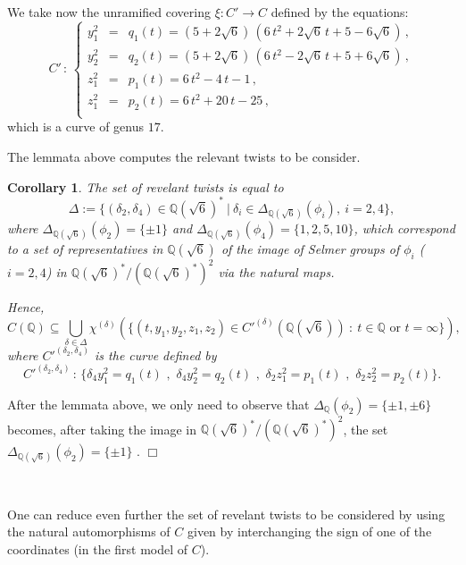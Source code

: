 \documentclass[a4paper,12pt]{amsart}
\newtheorem{cor}[thm]{Corollary}
\theoremstyle{remark}
\theoremstyle{definition}
\newenvironment{pf}{\par\noindent{\bf Proof.}\enspace\ignorespaces}{{\hfill $\Box$}\par\par}
\begin{document}
\

We take now the unramified covering $\xi: C'\to C$ defined by the
equations:
$$
C'\,:\,
\left\{
\begin{array}{rcl}
y_1^2&\!\!\!= &\!\!\! q_1(t)=  (5+2\sqrt{6})\,(6\,t^2+2\sqrt{6}\,t+5-6\sqrt{6})\,,\\[1mm]
y_2^2&\!\!\!= &\!\!\! q_2(t)= (5+2\sqrt{6})\,(6\,t^2-2\sqrt{6}\,t+5+6\sqrt{6})\,, \\[1mm]
z_1^2&\!\!\!= &\!\!\! p_1(t)= 6\,t^2-4\,t-1\,, \\[1mm]
z_1^2&\!\!\!= &\!\!\! p_2(t)=  6\,t^2+20\,t-25\,,\\[1mm]
\end{array}\right.
$$
which is a curve of genus $17$.

The lemmata above computes the relevant twists to be consider.

\begin{cor}\label{deltaC} The set of revelant twists is equal to
$$\Delta:=\{ (\delta_2,\delta_4)\in {{\mathbb{Q}}}(\sqrt{6})^* \ | \ \delta_i\in
\Delta_{{{\mathbb{Q}}}(\sqrt{6})}(\phi_i),\  i=2, 4\},$$ where $\Delta_{{{\mathbb{Q}}}(\sqrt{6})}(\phi_2)=\{ \pm 1\}$ and
$\Delta_{{{\mathbb{Q}}}(\sqrt{6})}(\phi_4)=\{1,2,5,10\}$, which correspond to a set of
representatives in ${{{\mathbb{Q}}}(\sqrt{6})}$ of the image of Selmer groups of $\phi_i$ ($i=2,4$)
in ${{{\mathbb{Q}}}(\sqrt{6})}^*/({{{\mathbb{Q}}}(\sqrt{6})}^*)^2$ via the natural maps.

Hence, $$C({{\mathbb{Q}}}) \subseteq \bigcup_{\delta \in \Delta}
\chi^{(\delta)}(\{(t,y_1,y_2,z_1,z_2)\in C'^{(\delta)}({{\mathbb{Q}}}(\sqrt{6}))\ : \ t\in {{\mathbb{Q}}}
 \mbox{ or } t=\infty \}),$$ where $C'^{(\delta_2,\delta_4)}$ is the curve defined by
$$C'^{(\delta_2,\delta_4)}\,:\,\{\delta_4 y_1^2=q_1(t) \,\,,\,\,
\delta_4 y_2^2=q_2(t) \,\,,\,\, \delta_2 z_1^2=p_1(t) \,\,,\,\, \delta_2 z_2^2=p_2(t)\}. $$
\end{cor}

\begin{pf} After the lemmata above, we only need to observe that
$\Delta_{{\mathbb{Q}}}(\phi_2)=\{ \pm 1,\pm 6\}$ becomes, after taking the
image in ${{{\mathbb{Q}}}(\sqrt{6})}^*/({{{\mathbb{Q}}}(\sqrt{6})}^*)^2$, the set
$\Delta_{{{\mathbb{Q}}}(\sqrt{6})}(\phi_2)=\{ \pm 1\}$ .
\end{pf}

\

One can reduce even further the set of revelant twists to be
considered by using the natural automorphisms of $C$ given by
interchanging the sign of one of the coordinates (in the first
model of $C$).
\end{document}
